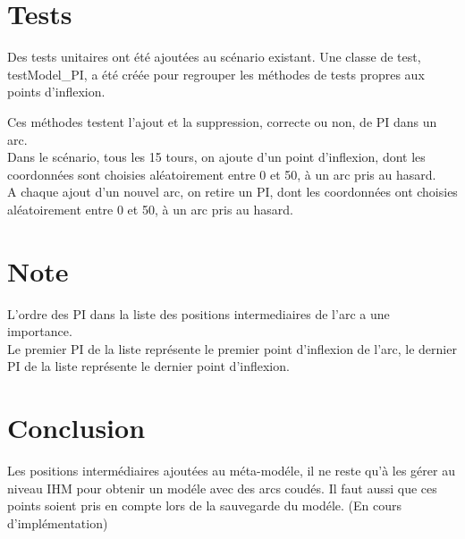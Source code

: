 \documentclass{article}
\begin{document}
\section{Tests}

Des tests unitaires ont \'et\'e ajout\'ees au sc\'enario existant.
Une classe de test, testModel\_PI, a \'et\'e cr\'e\'ee pour regrouper les m\'ethodes de tests propres aux points d'inflexion.

Ces m\'ethodes testent l'ajout et la suppression, correcte ou non, de PI dans un arc.\\

Dans le sc\'enario, tous les 15 tours, on ajoute d'un point d'inflexion, dont les coordonn\'ees sont choisies al\'eatoirement entre 0 et 50, \`a un arc pris au hasard.\\

A chaque ajout d'un nouvel arc, on retire un PI, dont les coordonn\'ees ont choisies al\'eatoirement entre 0  et 50, \`a un arc pris au hasard.

\section{Note}

L'ordre des PI dans la liste des positions intermediaires de l'arc a une importance.\\

Le premier PI de la liste repr\'esente le premier point d'inflexion de l'arc, le dernier PI de la liste repr\'esente le dernier point d'inflexion.

\section{Conclusion}

Les positions interm\'ediaires ajout\'ees au m\'eta-mod\'ele, il ne reste qu'\`a les g\'erer au niveau IHM pour obtenir un mod\'ele avec des arcs coud\'es.
Il faut aussi que ces points soient pris en compte lors de la sauvegarde du mod\'ele.
(En cours d'impl\'ementation)
\end{document}

